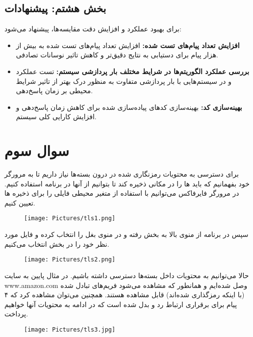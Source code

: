 \documentclass{report}
\begin{document}
\subsection*{بخش هشتم: پیشنهادات}
برای بهبود عملکرد و افزایش دقت مقایسه‌ها، پیشنهاد می‌شود:

\begin{itemize}
    \item \textbf{افزایش تعداد پیام‌های تست شده:} افزایش تعداد پیام‌های تست شده به بیش از هزار پیام برای دستیابی به نتایج دقیق‌تر و کاهش تاثیر نوسانات تصادفی.
    
    \item \textbf{بررسی عملکرد الگوریتم‌ها در شرایط مختلف بار پردازشی سیستم:} تست عملکرد  و  در سیستم‌هایی با بار پردازشی متفاوت به منظور درک بهتر از تاثیر شرایط محیطی بر زمان پاسخ‌دهی.
    
    \item \textbf{بهینه‌سازی کد:} بهینه‌سازی کدهای پیاده‌سازی شده برای کاهش زمان پاسخ‌دهی و افزایش کارایی کلی سیستم.
    
\end{itemize}

\section{سوال سوم}

برای دسترسی به محتویات رمزنگاری شده در درون بسته‌ها نیاز داریم تا به مرورگر خود بفهمانیم که باید  ها را در مکانی ذخیره کند تا بتوانیم از آنها در برنامه  استفاده کنیم. در مرورگر فایرفاکس می‌توانیم با استفاده از متغیر محیطی  فایلی را برای ذخیره  ها تعیین کنیم.
\begin{figure}[H]
    \centering
    \texttt{[image: Pictures/tls1.png]}
    \label{tls1}
\end{figure}

سپس در برنامه  از منوی بالا به بخش  رفته و در منوی بغل  را انتخاب کرده و فایل مورد نظر خود را در بخش  انتخاب می‌کنیم.
\begin{figure}[H]
    \centering
    \texttt{[image: Pictures/tls2.png]}
    \label{tls2}
\end{figure}

حالا می‌توانیم به محتویات داخل بسته‌ها دسترسی داشته باشیم. در مثال پایین به سایت www.amazon.com وصل شده‌ایم و همانطور که مشاهده می‌شود فریم‌های  تبادل شده (با اینکه رمزگذاری شده‌اند) قابل مشاهده هستند. همچنین می‌توان مشاهده کرد که ۴ پیام برای برقراری ارتباط  رد و بدل شده است که در ادامه به محتویات آنها خواهیم پرداخت.
\begin{figure}[H]
    \centering
    \texttt{[image: Pictures/tls3.jpg]}
    \label{tls3}
\end{figure}
\end{document}
